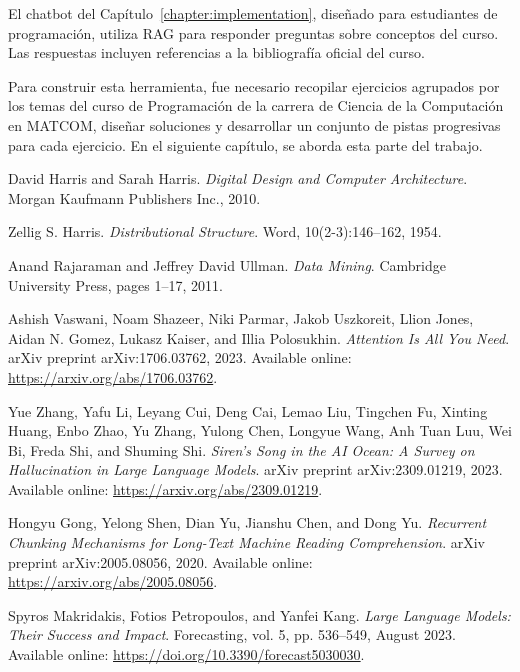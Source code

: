 \documentclass{article}
\begin{document}
El chatbot del Capítulo~\ref{chapter:implementation}, diseñado para estudiantes de programación, utiliza RAG para responder preguntas sobre conceptos del curso. Las respuestas incluyen referencias a la bibliografía oficial del curso.

Para construir esta herramienta, fue necesario recopilar ejercicios agrupados por los temas del curso de Programación de la carrera de Ciencia de la Computación en \mbox{MATCOM}, diseñar soluciones y desarrollar un conjunto de pistas progresivas para cada ejercicio. En el siguiente capítulo, se aborda esta parte del trabajo.

\begin{thebibliography}{99}

David Harris and Sarah Harris.
\textit{Digital Design and Computer Architecture}. 
Morgan Kaufmann Publishers Inc., 2010.

Zellig S. Harris.
\textit{Distributional Structure}. 
Word, 10(2-3):146--162, 1954.

Anand Rajaraman and Jeffrey David Ullman.
\textit{Data Mining}. 
Cambridge University Press, pages 1--17, 2011.

Ashish Vaswani, Noam Shazeer, Niki Parmar, Jakob Uszkoreit, Llion Jones, Aidan N. Gomez, Lukasz Kaiser, and Illia Polosukhin. 
\textit{Attention Is All You Need}. 
arXiv preprint arXiv:1706.03762, 2023. 
Available online: \url{https://arxiv.org/abs/1706.03762}.

Yue Zhang, Yafu Li, Leyang Cui, Deng Cai, Lemao Liu, Tingchen Fu, Xinting Huang, Enbo Zhao, Yu Zhang, Yulong Chen, Longyue Wang, Anh Tuan Luu, Wei Bi, Freda Shi, and Shuming Shi. 
\textit{Siren's Song in the AI Ocean: A Survey on Hallucination in Large Language Models}. 
arXiv preprint arXiv:2309.01219, 2023. 
Available online: \url{https://arxiv.org/abs/2309.01219}.

Hongyu Gong, Yelong Shen, Dian Yu, Jianshu Chen, and Dong Yu. 
\textit{Recurrent Chunking Mechanisms for Long-Text Machine Reading Comprehension}. 
arXiv preprint arXiv:2005.08056, 2020. 
Available online: \url{https://arxiv.org/abs/2005.08056}.

Spyros Makridakis, Fotios Petropoulos, and Yanfei Kang. 
\textit{Large Language Models: Their Success and Impact}. 
Forecasting, vol. 5, pp. 536--549, August 2023. 
Available online: \url{https://doi.org/10.3390/forecast5030030}.


\end{thebibliography}
\end{document}
